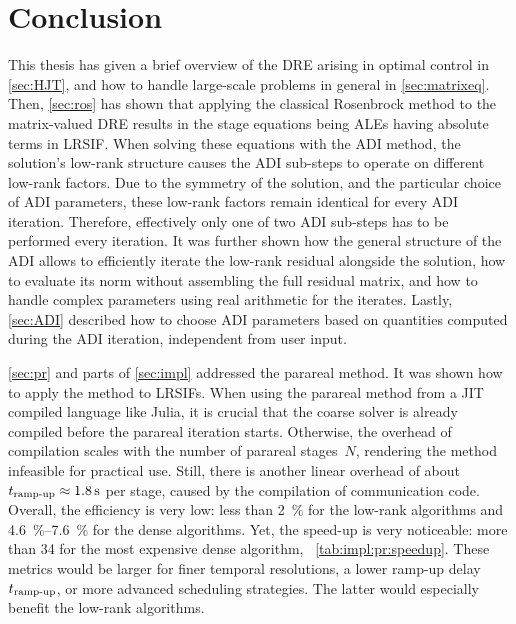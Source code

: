 \chapter{Conclusion}
\label{sec:conclusion}


This thesis has given a brief overview of the \ac{DRE} arising in optimal control in \autoref{sec:HJT},
and how to handle large-scale problems in general in \autoref{sec:matrixeq}.
Then, \autoref{sec:ros} has shown that
applying the classical Rosenbrock method to the matrix-valued \ac{DRE}
results in the stage equations being \acp{ALE}
having absolute terms in \ac{LRSIF}.
When solving these equations with the \ac{ADI} method,
the solution's low-rank structure causes the \ac{ADI} sub-steps to operate on different low-rank factors.
Due to the symmetry of the solution,
and the particular choice of \ac{ADI} parameters,
these low-rank factors remain identical for every \ac{ADI} iteration.
Therefore, effectively only one of two \ac{ADI} sub-steps has to be performed every iteration.
It was further shown how the general structure of the \ac{ADI} allows to efficiently iterate the low-rank residual alongside the solution,
how to evaluate its norm without assembling the full residual matrix,
and how to handle complex parameters using real arithmetic for the iterates.
Lastly, \autoref{sec:ADI} described how to choose \ac{ADI} parameters based on quantities computed during the \ac{ADI} iteration,
\ie independent from user input.

\autoref{sec:pr} and parts of \autoref{sec:impl} addressed the parareal method.
It was shown how to apply the method to \acp{LRSIF}.
When using the parareal method from a \ac{JIT} compiled language like Julia,
it is crucial that the coarse solver is already compiled before the parareal iteration starts.
Otherwise, the overhead of compilation scales with the number of parareal stages~$N$,
rendering the method infeasible for practical use.
Still, there is another linear overhead of about $t_\text{ramp-up} \approx \SI{1.8}{\second}$ per stage,
caused by the compilation of communication code.
Overall, the efficiency is very low:
less than \SI{2}{\percent} for the low-rank algorithms and
\SIrange{4.6}{7.6}{\percent} for the dense algorithms.
Yet, the speed-up is very noticeable:
\eg more than \num{34} for the most expensive dense algorithm,
\cf~\autoref{tab:impl:pr:speedup}.
These metrics would be larger for finer temporal resolutions,
a lower ramp-up delay~$t_\text{ramp-up}$,
or more advanced scheduling strategies.
The latter would especially benefit the low-rank algorithms.

